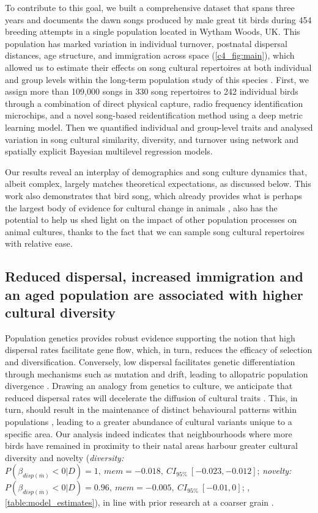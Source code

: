 To contribute to this goal, we built a comprehensive dataset that spans three years and documents the dawn songs produced by male great tit birds during 454 breeding attempts in a single population located in Wytham Woods, UK. This population has marked variation in individual turnover, postnatal dispersal distances, age structure, and immigration across space (\autoref{c4_fig:main}), which allowed us to estimate their effects on song cultural repertoires at both individual and group levels within the long-term population study of this species \parencite{lack1964}. First, we assign more than 109,000 songs in 330 song repertoires to 242 individual birds through a combination of direct physical capture, radio frequency identification microchips, and a novel song-based reidentification method using a deep metric learning model. Then we quantified individual and group-level traits and analysed variation in song cultural similarity, diversity, and turnover using network and spatially explicit Bayesian multilevel regression models.

Our results reveal an interplay of demographics and song culture dynamics that, albeit complex, largely matches theoretical expectations, as discussed below. This work also demonstrates that bird song, which already provides what is perhaps the largest body of evidence for cultural change in animals \parencite{laland2006}, also has the potential to help us shed light on the impact of other population processes on animal cultures, thanks to the fact that we can sample song cultural repertoires with relative ease.


\subsection{Reduced dispersal, increased immigration and an aged population are associated with higher cultural diversity}

Population genetics provides robust evidence supporting the notion that high dispersal rates facilitate gene flow, which, in turn, reduces the efficacy of selection and diversification. Conversely, low dispersal facilitates genetic differentiation through mechanisms such as mutation and drift, leading to allopatric population divergence \parencite{suarez2022, claramunt2011, papadopoulou2009}. Drawing an analogy from genetics to culture, we anticipate that reduced dispersal rates will decelerate the diffusion of cultural traits \parencite{nunn2009}. This, in turn, should result in the maintenance of distinct behavioural patterns within populations \parencite{whitehead2012, planque2014}, leading to a greater abundance of cultural variants unique to a specific area. Our analysis indeed indicates that neighbourhoods where more birds have remained in proximity to their natal areas harbour greater cultural diversity and novelty (\textit{diversity:} $P(\beta_{disp (\overline{m})} < 0 | D) = 1,~ mem = -0.018,~CI_{95\%}~[-0.023, -0.012]$; \textit{novelty:} $P(\beta_{disp (\overline{m})} < 0 | D) = 0.96,~ mem = -0.005,~CI_{95\%}~[-0.01, 0]$; , \autoref{table:model_estimates}), in line with prior research at a coarser grain \parencite{fayet2014}. 

